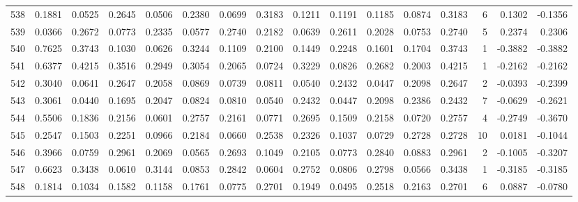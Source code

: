 \begin{tabular}{lrrrrrrrrrrrrrrr}
538 &      0.1881 &  0.0525 &  0.2645 &  0.0506 &  0.2380 &  0.0699 &  0.3183 &  0.1211 &  0.1191 &  0.1185 &   0.0874 &     0.3183 &      6 &                    0.1302 &                    -0.1356 \\
539 &      0.0366 &  0.2672 &  0.0773 &  0.2335 &  0.0577 &  0.2740 &  0.2182 &  0.0639 &  0.2611 &  0.2028 &   0.0753 &     0.2740 &      5 &                    0.2374 &                     0.2306 \\
540 &      0.7625 &  0.3743 &  0.1030 &  0.0626 &  0.3244 &  0.1109 &  0.2100 &  0.1449 &  0.2248 &  0.1601 &   0.1704 &     0.3743 &      1 &                   -0.3882 &                    -0.3882 \\
541 &      0.6377 &  0.4215 &  0.3516 &  0.2949 &  0.3054 &  0.2065 &  0.0724 &  0.3229 &  0.0826 &  0.2682 &   0.2003 &     0.4215 &      1 &                   -0.2162 &                    -0.2162 \\
542 &      0.3040 &  0.0641 &  0.2647 &  0.2058 &  0.0869 &  0.0739 &  0.0811 &  0.0540 &  0.2432 &  0.0447 &   0.2098 &     0.2647 &      2 &                   -0.0393 &                    -0.2399 \\
543 &      0.3061 &  0.0440 &  0.1695 &  0.2047 &  0.0824 &  0.0810 &  0.0540 &  0.2432 &  0.0447 &  0.2098 &   0.2386 &     0.2432 &      7 &                   -0.0629 &                    -0.2621 \\
544 &      0.5506 &  0.1836 &  0.2156 &  0.0601 &  0.2757 &  0.2161 &  0.0771 &  0.2695 &  0.1509 &  0.2158 &   0.0720 &     0.2757 &      4 &                   -0.2749 &                    -0.3670 \\
545 &      0.2547 &  0.1503 &  0.2251 &  0.0966 &  0.2184 &  0.0660 &  0.2538 &  0.2326 &  0.1037 &  0.0729 &   0.2728 &     0.2728 &     10 &                    0.0181 &                    -0.1044 \\
546 &      0.3966 &  0.0759 &  0.2961 &  0.2069 &  0.0565 &  0.2693 &  0.1049 &  0.2105 &  0.0773 &  0.2840 &   0.0883 &     0.2961 &      2 &                   -0.1005 &                    -0.3207 \\
547 &      0.6623 &  0.3438 &  0.0610 &  0.3144 &  0.0853 &  0.2842 &  0.0604 &  0.2752 &  0.0806 &  0.2798 &   0.0566 &     0.3438 &      1 &                   -0.3185 &                    -0.3185 \\
548 &      0.1814 &  0.1034 &  0.1582 &  0.1158 &  0.1761 &  0.0775 &  0.2701 &  0.1949 &  0.0495 &  0.2518 &   0.2163 &     0.2701 &      6 &                    0.0887 &                    -0.0780 \\

\end{tabular}
